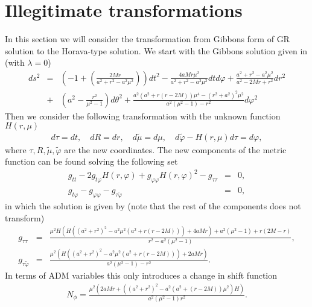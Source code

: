\documentclass[preprint,aps,tightenlines,showkeys,nofootinbib,superscriptaddress]{revtex4}
\begin{document}

\section{Illegitimate transformations}
In this section we will consider the transformation from Gibbons form of GR solution to the Horava-type solution. We start with the Gibbons solution given in \cite{Gibb:2004} (with $\lambda = 0$) 
\begin{eqnarray}
  ds^{2} &= & \left(  -1+\left(\frac{2Mr}{a^{2}+r^{2}-a^{2}\mu ^{2}     }\right)\right)dt^2
  -\frac{4aMr \mu^{2}}{a^{2}+r^{2}-a^2 \mu^2   }dt d \varphi+\frac{a^{2}+r^{2}-a^{2}\mu ^{2}    }{a^{2}-2Mr+r^{2}  }dr^2 \nonumber\\
           & +& \left(a^{2} - \frac{r^{2}}{\mu ^{2}-1 } \right)d \theta ^{2} 
           +\frac{a^2(a^2+r(r-2M))\mu ^{4}-(r^2+a^2)^2 \mu ^2}{a^2(\mu ^2-1)-r^2 }d \varphi ^2 
\end{eqnarray}
Then we consider the following transformation with the unknown function $H(r,\mu )$
\begin{eqnarray}
  d \tau  = dt,\quad dR=dr,\quad d \tilde \mu  = d \mu, \quad d \tilde \varphi -H(r,\mu )d \tau = d \varphi, 
\end{eqnarray}
where $\tau ,R,\tilde \mu , \tilde \varphi $ are the new coordinates. The new components of the metric
function can be found solving the following set
\begin{eqnarray}
  g_{t t}-2g_{t \varphi }H(r,\varphi )+g_{\varphi \varphi }H(r,\varphi )^{2}-g_{\tau \tau }&=&0,\\
  g_{t \varphi }-g_{\varphi  \varphi }-g_{\tau \tilde \varphi }&=&0,
\end{eqnarray}
in which the solution is given by (note that the rest of the components does not transform)
\begin{eqnarray}
  g_{\tau \tau} &=& \frac{{\mu }^2 H \left(H \left(\left(a^2+r^2\right)^2-a^2 {\mu }^2 \left(a^2+r (r-2 M)\right)\right)+4 a M r\right)+a^2 \left({\mu }^2-1\right)+r (2 M-r)}{r^2-a^2 \left({\mu }^2-1\right)},\\
  g_{\tau \tilde\varphi} &=&\frac{\mu ^2 \left(H \left(\left(a^2+r^2\right)^2-a^2 \mu ^2 \left(a^2+r (r-2 M)\right)\right)+2 a M r\right)}{a^2 \left(\mu ^2-1\right)-r^2}. 
\end{eqnarray}
In terms of ADM variables this only introduces a change in shift function
\begin{eqnarray}
  N_{\phi} = \frac{\mu ^{2}(2aMr+((a^{2}+r^2 )^{2}-a^{2}(a^{2}+(r-2M) )\mu ^{2}   )H) }{a^{2}(\mu^{2}-1 ) r^{2} }.
\end{eqnarray}
\end{document}
